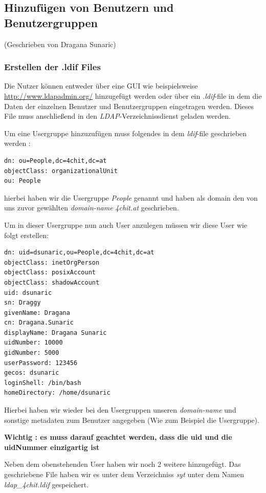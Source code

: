 \subsection{Hinzufügen von Benutzern und Benutzergruppen}
(Geschrieben von Dragana Sunaric)

\subsubsection{Erstellen der .ldif Files}
Die Nutzer können entweder über eine GUI wie beispielsweise \url{http://www.ldapadmin.org/} hinzugefügt werden oder über ein \textit{.ldif}-file in dem 
die Daten der einzelnen Benutzer und Benutzergruppen eingetragen werden.
Dieses File muss anschließend in den \textit{LDAP}-Verzeichnissdienst geladen werden.

Um eine Usergruppe hinzuzufügen muss folgendes in dem \textit{ldif}-file geschrieben werden :

\begin{lstlisting}[caption=Usergruppe hinzufügen]
dn: ou=People,dc=4chit,dc=at
objectClass: organizationalUnit
ou: People
\end{lstlisting}

hierbei haben wir die Usergruppe \textit{People} genannt und haben als domain den von uns zuvor gewählten \textit{domain-name}  \textit{4chit.at} geschrieben.

Um in dieser Usergruppe nun auch User anzulegen müssen wir diese User wie folgt erstellen:

\begin{lstlisting}[caption=User hinzufügen]
dn: uid=dsunaric,ou=People,dc=4chit,dc=at
objectClass: inetOrgPerson
objectClass: posixAccount
objectClass: shadowAccount
uid: dsunaric
sn: Draggy
givenName: Dragana
cn: Dragana.Sunaric
displayName: Dragana Sunaric
uidNumber: 10000
gidNumber: 5000
userPassword: 123456
gecos: dsunaric
loginShell: /bin/bash
homeDirectory: /home/dsunaric
\end{lstlisting}

Hierbei haben wir wieder bei den Usergruppen unseren \textit{domain-name} und sonstige metadaten zum Benutzer angegeben (Wie zum Beispiel die Usergruppe).

\textbf{Wichtig : es muss darauf geachtet werden, dass die uid und die uidNummer einzigartig ist}

Neben dem obenstehenden User haben wir noch 2 weitere hinzugefügt.
Das geschriebene File haben wir es unter dem Verzeichniss \textit{syt} unter dem Namen \textit{ldap\_4chit.ldif} gespeichert.

